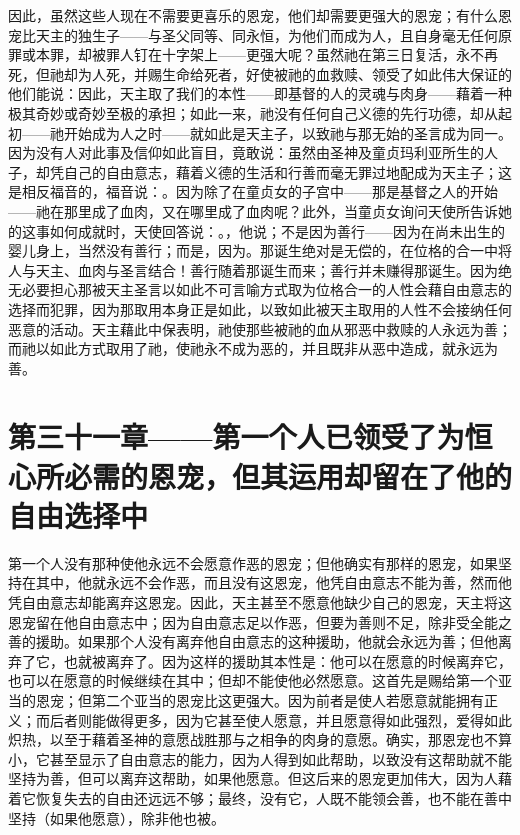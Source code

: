 因此，虽然这些人现在不需要更喜乐的恩宠，他们却需要更强大的恩宠；有什么恩宠比天主的独生子——与圣父同等、同永恒，为他们而成为人，且自身毫无任何原罪或本罪，却被罪人钉在十字架上——更强大呢？虽然祂在第三日复活，永不再死，但祂却为人死，并赐生命给死者，好使被祂的血救赎、领受了如此伟大保证的他们能说：因此，天主取了我们的本性——即基督的人的灵魂与肉身——藉着一种极其奇妙或奇妙至极的承担；如此一来，祂没有任何自己义德的先行功德，却从起初——祂开始成为人之时——就如此是天主子，以致祂与那无始的圣言成为同一。因为没有人对此事及信仰如此盲目，竟敢说：虽然由圣神及童贞玛利亚所生的人子，却凭自己的自由意志，藉着义德的生活和行善而毫无罪过地配成为天主子；这是相反福音的，福音说：。因为除了在童贞女的子宫中——那是基督之人的开始——祂在那里成了血肉，又在哪里成了血肉呢？此外，当童贞女询问天使所告诉她的这事如何成就时，天使回答说：。，他说；不是因为善行——因为在尚未出生的婴儿身上，当然没有善行；而是，因为。那诞生绝对是无偿的，在位格的合一中将人与天主、血肉与圣言结合！善行随着那诞生而来；善行并未赚得那诞生。因为绝无必要担心那被天主圣言以如此不可言喻方式取为位格合一的人性会藉自由意志的选择而犯罪，因为那取用本身正是如此，以致如此被天主取用的人性不会接纳任何恶意的活动。天主藉此中保表明，祂使那些被祂的血从邪恶中救赎的人永远为善；而祂以如此方式取用了祂，使祂永不成为恶的，并且既非从恶中造成，就永远为善。\par


\section{第三十一章——第一个人已领受了为恒心所必需的恩宠，但其运用却留在了他的自由选择中}

第一个人没有那种使他永远不会愿意作恶的恩宠；但他确实有那样的恩宠，如果坚持在其中，他就永远不会作恶，而且没有这恩宠，他凭自由意志不能为善，然而他凭自由意志却能离弃这恩宠。因此，天主甚至不愿意他缺少自己的恩宠，天主将这恩宠留在他自由意志中；因为自由意志足以作恶，但要为善则不足，除非受全能之善的援助。如果那个人没有离弃他自由意志的这种援助，他就会永远为善；但他离弃了它，也就被离弃了。因为这样的援助其本性是：他可以在愿意的时候离弃它，也可以在愿意的时候继续在其中；但却不能使他必然愿意。这首先是赐给第一个亚当的恩宠；但第二个亚当的恩宠比这更强大。因为前者是使人若愿意就能拥有正义；而后者则能做得更多，因为它甚至使人愿意，并且愿意得如此强烈，爱得如此炽热，以至于藉着圣神的意愿战胜那与之相争的肉身的意愿。确实，那恩宠也不算小，它甚至显示了自由意志的能力，因为人得到如此帮助，以致没有这帮助就不能坚持为善，但可以离弃这帮助，如果他愿意。但这后来的恩宠更加伟大，因为人藉着它恢复失去的自由还远远不够；最终，没有它，人既不能领会善，也不能在善中坚持（如果他愿意），除非他也被。\par

